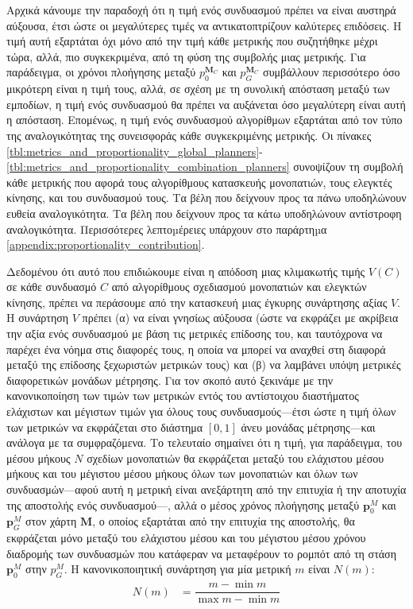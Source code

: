 Αρχικά κάνουμε την παραδοχή ότι η τιμή ενός συνδυασμού πρέπει να είναι αυστηρά
αύξουσα, έτσι ώστε οι μεγαλύτερες τιμές να αντικατοπτρίζουν καλύτερες
επιδόσεις. Η τιμή αυτή εξαρτάται όχι μόνο από την τιμή κάθε μετρικής που
συζητήθηκε μέχρι τώρα, αλλά, πιο συγκεκριμένα, από τη φύση της συμβολής μιας
μετρικής. Για παράδειγμα, οι χρόνοι πλοήγησης μεταξύ $p_0^{\bm{M}_C}$ και
$p_G^{\bm{M}_C}$ συμβάλλουν περισσότερο όσο μικρότερη είναι η τιμή τους, αλλά,
σε σχέση με τη συνολική απόσταση μεταξύ των εμποδίων, η τιμή ενός συνδυασμού θα
πρέπει να αυξάνεται όσο μεγαλύτερη είναι αυτή η απόσταση. Επομένως, η τιμή ενός
συνδυασμού αλγορίθμων εξαρτάται από τον τύπο της αναλογικότητας της συνεισφοράς
κάθε συγκεκριμένης μετρικής. Οι πίνακες
\ref{tbl:metrics_and_proportionality_global_planners}-\ref{tbl:metrics_and_proportionality_combination_planners}
συνοψίζουν τη συμβολή κάθε μετρικής που αφορά τους αλγορίθμους κατασκευής
μονοπατιών, τους ελεγκτές κίνησης, και του συνδυασμού τους. Τα βέλη που
δείχνουν προς τα πάνω υποδηλώνουν ευθεία αναλογικότητα. Τα βέλη που δείχνουν
προς τα κάτω υποδηλώνουν αντίστροφη αναλογικότητα. Περισσότερες λεπτοµέρειες
υπάρχουν στο παράρτηµα \ref{appendix:proportionality_contribution}.

Δεδομένου ότι αυτό που επιδιώκουμε είναι η απόδοση μιας κλιμακωτής τιμής $V(C)$ σε
κάθε συνδυασμό $C$ από αλγορίθμους σχεδιασμού μονοπατιών και ελεγκτών κίνησης,
πρέπει να περάσουμε από την κατασκευή μιας έγκυρης συνάρτησης αξίας $V$. Η
συνάρτηση $V$ πρέπει (α) να είναι γνησίως αύξουσα (ώστε να εκφράζει με ακρίβεια
την αξία ενός συνδυασμού με βάση τις μετρικές επίδοσης του, και ταυτόχρονα να
παρέχει ένα νόημα στις διαφορές τους, η οποία να μπορεί να αναχθεί στη διαφορά
μεταξύ της επίδοσης ξεχωριστών μετρικών τους) και (β) να λαμβάνει υπόψη
μετρικές διαφορετικών μονάδων μέτρησης. Για τον σκοπό αυτό ξεκινάμε με την
κανονικοποίηση των τιμών των μετρικών εντός του αντίστοιχου διαστήματος
ελάχιστων και μέγιστων τιμών για όλους τους συνδυασμούς---έτσι ώστε η τιμή όλων
των μετρικών να εκφράζεται στο διάστημα $[0,1]$ άνευ μονάδας μέτρησης---και
ανάλογα με τα συμφραζόμενα. Το τελευταίο σημαίνει ότι η τιμή, για παράδειγμα,
του μέσου μήκους $N$ σχεδίων μονοπατιών θα εκφράζεται μεταξύ του ελάχιστου μέσου
μήκους και του μέγιστου μέσου μήκους όλων των μονοπατιών και όλων των
συνδυασμών---αφού αυτή η μετρική είναι ανεξάρτητη από την επιτυχία ή την
αποτυχία της αποστολής ενός συνδυασμού---, αλλά ο μέσος χρόνος πλοήγησης μεταξύ
$\bm{p}_0^M$ και $\bm{p}_G^M$ στον χάρτη $\bm{M}$, ο οποίος εξαρτάται από την
επιτυχία της αποστολής, θα εκφράζεται μόνο μεταξύ του ελάχιστου μέσου και του
μέγιστου μέσου χρόνου διαδρομής των συνδυασμών που κατάφεραν να μεταφέρουν το
ρομπότ από τη στάση $\bm{p}_0^M$ στην ${p}_G^M$. Η κανονικοποιητική συνάρτηση
για μία μετρική $m$ είναι $N(m)$:
\begin{align}
  N(m) &= \dfrac{m - \min m}{\max m - \min m}
\end{align}

